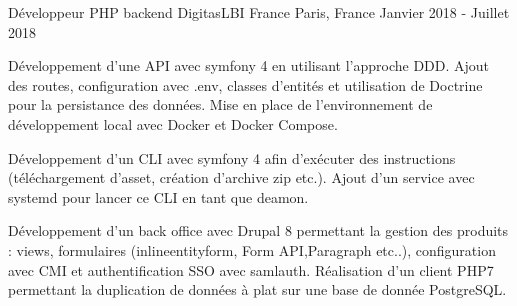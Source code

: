 \cventry
{Développeur PHP backend} %
{DigitasLBI France} %
{Paris, France} %
{Janvier 2018 - Juillet 2018} %
{
\begin{cvitems} %
    \item
    {
        Développement d'une API avec symfony 4 en utilisant l'approche DDD. Ajout des routes, configuration avec .env, classes
        d'entités et utilisation de Doctrine pour la persistance des données. Mise en place de l'environnement de développement local avec Docker et Docker Compose.
    }
    \item
    {
        Développement d'un CLI avec symfony 4 afin d'exécuter des instructions (téléchargement d'asset, création d'archive zip etc.).
        Ajout d'un service avec systemd pour lancer ce CLI en tant que deamon.
    }
    \item
    {
        Développement d'un back office avec Drupal 8 permettant la gestion des produits : views, formulaires (inline\textunderscore entity\textunderscore form, 
        Form API,Paragraph etc..), configuration avec CMI et authentification SSO avec samlauth. Réalisation d'un client PHP7 permettant la duplication de données à plat sur une base de donnée PostgreSQL.
    }
\end{cvitems}
}
